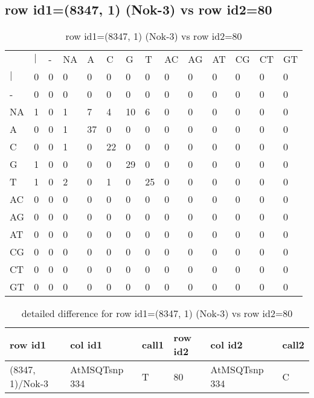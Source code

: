 \subsection{row id1=(8347, 1) (Nok-3) vs row id2=80}
\begin{center}
\begin{longtable}{|l|l|l|l|l|l|l|l|l|l|l|l|l|l|}
\caption{row id1=(8347, 1) (Nok-3) vs row id2=80} \label{table_dm560}\\
\hline
\\
\hline
&$|$&-&NA&A&C&G&T&AC&AG&AT&CG&CT&GT\\
$|$&0&0&0&0&0&0&0&0&0&0&0&0&0\\
-&0&0&0&0&0&0&0&0&0&0&0&0&0\\
NA&1&0&1&7&4&10&6&0&0&0&0&0&0\\
A&0&0&1&37&0&0&0&0&0&0&0&0&0\\
C&0&0&1&0&22&0&0&0&0&0&0&0&0\\
G&1&0&0&0&0&29&0&0&0&0&0&0&0\\
T&1&0&2&0&1&0&25&0&0&0&0&0&0\\
AC&0&0&0&0&0&0&0&0&0&0&0&0&0\\
AG&0&0&0&0&0&0&0&0&0&0&0&0&0\\
AT&0&0&0&0&0&0&0&0&0&0&0&0&0\\
CG&0&0&0&0&0&0&0&0&0&0&0&0&0\\
CT&0&0&0&0&0&0&0&0&0&0&0&0&0\\
GT&0&0&0&0&0&0&0&0&0&0&0&0&0\\
\hline
\end{longtable}
\end{center}

\begin{center}
\begin{longtable}{|l|l|l|l|l|l|}
\caption{detailed difference for row id1=(8347, 1) (Nok-3) vs row id2=80} \label{table_dm561}\\
\hline
row id1&col id1&call1&row id2&col id2&call2\\
\hline
(8347, 1)/Nok-3&AtMSQTsnp 334&T&80&AtMSQTsnp 334&C\\
\hline
\end{longtable}
\end{center}

